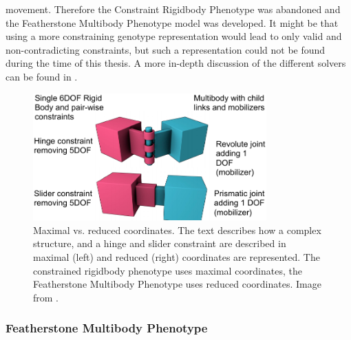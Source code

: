 \documentclass[main]{subfiles}
\begin{document}
movement. Therefore the Constraint Rigidbody Phenotype was abandoned and the Featherstone Multibody Phenotype model was developed. It might be that using a more constraining genotype representation would lead to only valid and non-contradicting constraints, but such a representation could not be found during the time of this thesis. A more in-depth discussion of the different solvers can be found in \cite{bib::Coumans2014}.

\begin{figure}[H]
\centering
\includegraphics[width=0.8\textwidth]{Pictures/evolutionary-optimization/maximal-vs-reduced-coordinates.pdf}

\caption[Maximal vs. reduced coordinates]{Maximal vs. reduced coordinates. The text describes how a complex structure, and a hinge and slider constraint are described in maximal (left) and reduced (right) coordinates are represented. The constrained rigidbody phenotype uses maximal coordinates, the Featherstone Multibody Phenotype uses reduced coordinates. Image from \cite{bib::Coumans2014}.}
\label{figure:maximal-vs-reduced}
\end{figure}

\subsubsection{Featherstone Multibody Phenotype}
\end{document}
